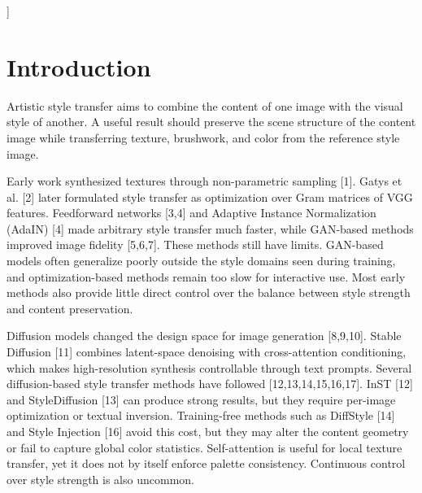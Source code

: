 \documentclass[10pt,twocolumn]{article}
\begin{document}
{\begin{minipage}{\textwidth}
\end{minipage}
\vspace{0pt}
}]

\clearpage

\vspace{-4pt}
\vspace{6pt}

\section{Introduction}

Artistic style transfer aims to combine the content of one image with the visual style of another. A useful result should preserve the scene structure of the content image while transferring texture, brushwork, and color from the reference style image.

Early work synthesized textures through non-parametric sampling [1]. Gatys et al. [2] later formulated style transfer as optimization over Gram matrices of VGG features. Feedforward networks [3,4] and Adaptive Instance Normalization (AdaIN) [4] made arbitrary style transfer much faster, while GAN-based methods improved image fidelity [5,6,7]. These methods still have limits. GAN-based models often generalize poorly outside the style domains seen during training, and optimization-based methods remain too slow for interactive use. Most early methods also provide little direct control over the balance between style strength and content preservation.

Diffusion models changed the design space for image generation [8,9,10]. Stable Diffusion [11] combines latent-space denoising with cross-attention conditioning, which makes high-resolution synthesis controllable through text prompts. Several diffusion-based style transfer methods have followed [12,13,14,15,16,17]. InST [12] and StyleDiffusion [13] can produce strong results, but they require per-image optimization or textual inversion. Training-free methods such as DiffStyle [14] and Style Injection [16] avoid this cost, but they may alter the content geometry or fail to capture global color statistics. Self-attention is useful for local texture transfer, yet it does not by itself enforce palette consistency. Continuous control over style strength is also uncommon.
\end{document}
